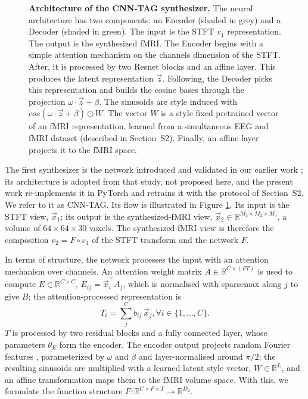 \documentclass[10pt]{article}
\begin{document}
\begin{figure}[!t]
\begin{tikzpicture}
    \end{tikzpicture}
    \caption{\textbf{Architecture of the CNN-TAG synthesizer.} The neural architecture has two components: an Encoder (shaded in grey) and a Decoder (shaded in green). The input is the STFT $v_1$ representation. The output is the synthesized fMRI. The Encoder begins with a simple attention mechanism on the channels dimension of the STFT. After, it is processed by two Resnet blocks and an affine layer. This produces the latent representation $\vec{z}$. Following, the Decoder picks this representation and builds the cosine bases through the projection $\omega \cdot \vec{z} + \beta$. The sinusoids are style induced with $cos(\omega \cdot \vec{z} + \beta)\odot W$. The vector $W$ is a style fixed pretrained vector of an fMRI representation, learned from a simultaneous EEG and fMRI dataset (described in Section~S2). Finally, an affine layer projects it to the fMRI space.}
    \label{fig:horizontal_architecture}
\end{figure}

The first synthesizer is the network introduced and validated in our earlier work \cite{calhas2022eeg}; its architecture is adopted from that study, not proposed here, and the present work re-implements it in PyTorch and retrains it with the protocol of Section~S2. We refer to it as CNN-TAG. Its flow is illustrated in Figure \ref{fig:horizontal_architecture}. Its input is the STFT view, $\vec{x}_1$; its output is the synthesized-fMRI view, $\vec{x}_2 \in \mathbb{R}^{M_1 \times M_2 \times M_3}$, a volume of $64\times64\times30$ voxels. The synthesized-fMRI view is therefore the composition $v_2 = F \circ v_1$ of the STFT transform and the network $F$.

In terms of structure, the network processes the input with an attention mechanism over channels. An attention weight matrix $A \in \mathbb{R}^{C \times (F T)}$ is used to compute $E \in \mathbb{R}^{C \times C}$, $E_{ij} = \vec{x}_i^\top A_j$, which is normalised with sparsemax along $j$ to give $B$; the attention-processed representation is
\begin{equation}\label{equation:attention_output}
    T_i  = \sum_j^C b_{ij}\, \vec{x}_j, \forall i \in \{1, \dots, C\}.
\end{equation}
$T$ is processed by two residual blocks \cite{he2016deep} and a fully connected layer, whose parameters $\theta_E$ form the encoder. The encoder output projects random Fourier features \cite{rahimi2007random,tancik2020fourier}, parameterized by $\omega$ and $\beta$ and layer-normalised around $\pi/2$; the resulting sinusoids are multiplied with a learned latent style vector, $W \in \mathbb{R}^L$, and an affine transformation maps them to the fMRI volume space. With this, we formulate the function structure $F: \mathbb{R}^{C \times F \times T} \to \mathbb{R}^{D_2}$.
\end{document}
